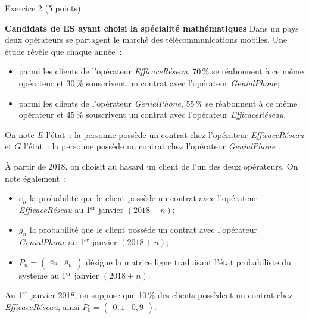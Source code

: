 
%
\begin{h2}Exercice 2 (5 points)\end{h2}
\textbf{Candidats de ES ayant choisi la spécialité \og mathématiques \fg{} }
\medskip
Dans un pays deux opérateurs se partagent le marché des télécommunications mobiles. Une étude révèle que chaque année~:
\begin{itemize}
     \item parmi les clients de l'opérateur \emph{EfficaceRéseau}, 70\,\% se réabonnent à ce même opérateur et 30\,\% souscrivent un contrat avec l'opérateur \emph{GenialPhone};
     \item parmi les clients de l'opérateur \emph{GenialPhone}, 55\,\% se réabonnent à ce même opérateur et 45\,\% souscrivent un contrat avec l'opérateur \emph{EfficaceRéseau}.
\end{itemize}
\bigskip
On note $E$ l'état~: \og la personne possède un contrat chez l'opérateur \emph{EfficaceRéseau} \fg{} et $G$ l'état~: \og la personne possède un contrat chez l'opérateur \emph{GenialPhone} \fg{}.
\par
À partir de 2018, on choisit au hasard un client de l'un des deux opérateurs.
\bigskip
On note également~:
\begin{itemize}
     \item $e_n$ la probabilité que le client possède un contrat avec l'opérateur \emph{EfficaceRéseau} au 1${^\text{er}}$ janvier $(2018+n)$;
     \item $g_n$ la probabilité que le client possède un contrat avec l'opérateur \emph{GenialPhone} au 1${^\text{er}}$ janvier $(2018+n)$;
     \item $P_n = \begin{pmatrix} e_n & g_n \end{pmatrix}$ désigne la matrice ligne traduisant l'état probabiliste du système au 1${^\text{er}}$ janvier $(2018+n)$.
\end{itemize}
\medskip
Au 1${^\text{er}}$ janvier 2018, on suppose que 10\,\% des clients possèdent un contrat chez \emph{EfficaceRéseau}, ainsi $P_0 = \begin{pmatrix} 0,1 & 0,9 \end{pmatrix}$.
\bigskip
